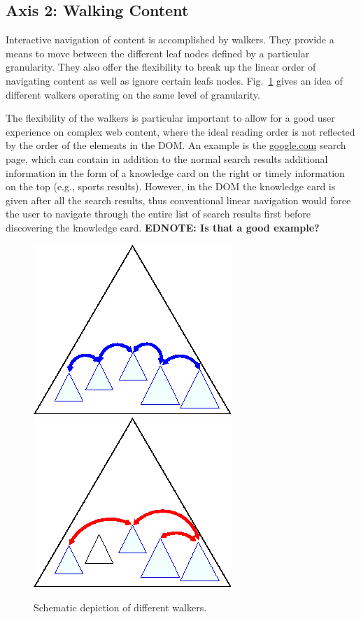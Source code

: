 \documentclass{sig-alternate}
\newcommand\ednote[1]{\typeout{There is still a note!!!}%
  {\bf EDNOTE: #1}}
\begin{document}
\subsection{Axis 2: Walking Content}
\label{sec:ax2}

Interactive navigation of content is accomplished by walkers.  They provide a
means to move between the different leaf nodes defined by a particular
granularity. They also offer the flexibility to break up the linear order of
navigating content as well as ignore certain leafs nodes. Fig.~\ref{fig:walkers} gives
an idea of different walkers operating on the same level of granularity.

The flexibility of the walkers is particular important to allow for a good user
experience on complex web content, where the ideal reading order is not
reflected by the order of the elements in the DOM. An example is the
\url{google.com} search page, which can contain in addition to the normal search
results additional information in the form of a knowledge card on the right or
timely information on the top (e.g., sports results). However, in the DOM the
knowledge card is given after all the search results, thus conventional linear
navigation would force the user to navigate through the entire list of search
results first before discovering the knowledge card.\ednote{Is that a good
  example?}

\begin{figure}[ht!]
  \begin{center}
    \leavevmode
    \includegraphics[width=.4\columnwidth]{images/walker1}
    \includegraphics[width=.4\columnwidth]{images/walker2}
    \caption{Schematic depiction of different walkers.}
    \label{fig:walkers}
  \end{center}
\end{figure}
\end{document}
